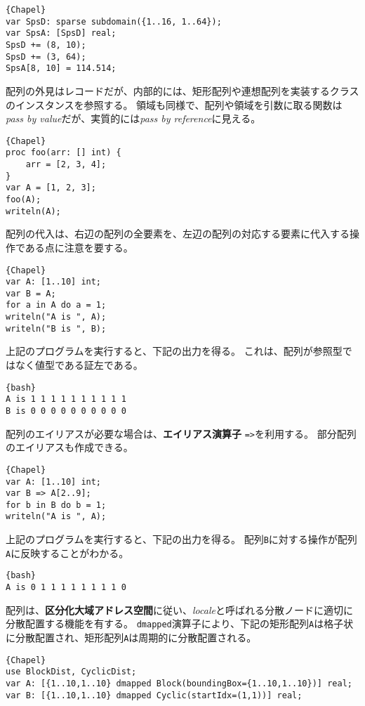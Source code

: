 \documentclass[10pt,a4paper]{book}
\begin{document}
\begin{Verbatim}{Chapel}
var SpsD: sparse subdomain({1..16, 1..64});
var SpsA: [SpsD] real;
SpsD += (8, 10);
SpsD += (3, 64);
SpsA[8, 10] = 114.514;
\end{Verbatim}

配列の外見はレコードだが、内部的には、矩形配列や連想配列を実装するクラスのインスタンスを参照する。
領域も同様で、配列や領域を引数に取る関数は\textit{pass by value}だが、実質的には\textit{pass by reference}に見える。

\begin{Verbatim}{Chapel}
proc foo(arr: [] int) {
	arr = [2, 3, 4];
}
var A = [1, 2, 3];
foo(A);
writeln(A);
\end{Verbatim}

配列の代入は、右辺の配列の全要素を、左辺の配列の対応する要素に代入する操作である点に注意を要する。

\begin{Verbatim}{Chapel}
var A: [1..10] int;
var B = A;
for a in A do a = 1;
writeln("A is ", A);
writeln("B is ", B);
\end{Verbatim}

上記のプログラムを実行すると、下記の出力を得る。
これは、配列が参照型ではなく値型である証左である。

\begin{Verbatim}{bash}
A is 1 1 1 1 1 1 1 1 1 1
B is 0 0 0 0 0 0 0 0 0 0
\end{Verbatim}

配列のエイリアスが必要な場合は、\textbf{エイリアス演算子} \verb#=>#を利用する。
部分配列のエイリアスも作成できる。

\begin{Verbatim}{Chapel}
var A: [1..10] int;
var B => A[2..9];
for b in B do b = 1;
writeln("A is ", A);
\end{Verbatim}

上記のプログラムを実行すると、下記の出力を得る。
配列\verb#B#に対する操作が配列\verb#A#に反映することがわかる。

\begin{Verbatim}{bash}
A is 0 1 1 1 1 1 1 1 1 0
\end{Verbatim}

配列は、\textbf{区分化大域アドレス空間}に従い、\textit{locale}と呼ばれる分散ノードに適切に分散配置する機能を有する。
\verb#dmapped#演算子により、下記の矩形配列\verb#A#は格子状に分散配置され、矩形配列\verb#A#は周期的に分散配置される。

\begin{Verbatim}{Chapel}
use BlockDist, CyclicDist;
var A: [{1..10,1..10} dmapped Block(boundingBox={1..10,1..10})] real;
var B: [{1..10,1..10} dmapped Cyclic(startIdx=(1,1))] real;
\end{Verbatim}
\end{document}
